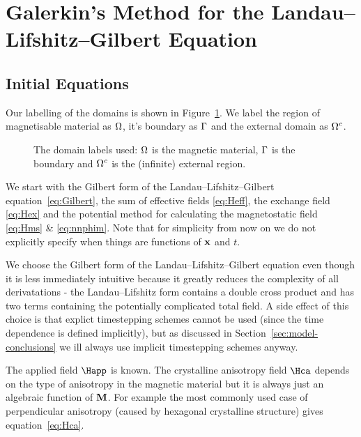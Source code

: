 
\section{Galerkin's Method for the Landau--Lifshitz--Gilbert Equation}
\label{sec:galerk-meth-llg}

\subsection{Initial Equations}

Our labelling of the domains is shown in Figure~\ref{fig:domain_labels}. We label the region of magnetisable material as $\Omega$, it's boundary as ${\Gamma}$ and the external domain as ${\Omega^c}$.

\begin{figure}[!ht]
  \center
  \caption{The domain labels used: $\Omega$ is the magnetic material, ${\Gamma}$ is the boundary and ${\Omega^c}$ is the (infinite) external region.} \label{fig:domain_labels}
\end{figure}

We start with the Gilbert form of the Landau--Lifshitz--Gilbert equation~\eqref{eq:Gilbert}, the sum of effective fields \eqref{eq:Heff}, the exchange field \eqref{eq:Hex} and the potential method for calculating the magnetostatic field \eqref{eq:Hms} \& \eqref{eq:nnphim}. Note that for simplicity from now on we do not explicitly specify when things are functions of $\mathbf{x}$ and $t$.

We choose the Gilbert form of the Landau--Lifshitz--Gilbert equation even though it is less immediately intuitive because it greatly reduces the complexity of all derivatations - the Landau--Lifshitz form contains a double cross product and has two terms containing the potentially complicated total field. A side effect of this choice is that explict timestepping schemes cannot be used (since the time dependence is defined implicitly), but as discussed in Section~\ref{sec:model-conclusions} we ill always use implicit timestepping schemes anyway.

The applied field $\Happ$ is known. The crystalline anisotropy field $\Hca$ depends on the type of anisotropy in the magnetic material but it is always just an algebraic function of $\mathbf{M}$. For example the most commonly used case of perpendicular anisotropy (caused by hexagonal crystalline structure) gives equation~\eqref{eq:Hca}.

